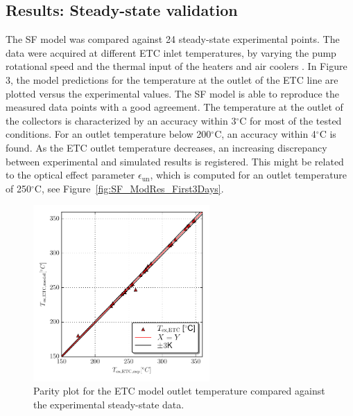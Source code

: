 \documentclass[final,3p,times,review]{elsarticle}
\begin{document}
%
\subsection{Results: Steady-state validation}
%
The SF model was compared against 24 steady-state experimental points. The data were acquired at different ETC inlet temperatures, by varying the pump rotational speed and the thermal input of the heaters and air coolers . In Figure 3, the model predictions for the temperature at the outlet of the ETC line are plotted versus the experimental values.
The SF model is able to reproduce the measured data points with a good agreement. The temperature at the outlet of the collectors is characterized  by an accuracy within 3$^{\circ}$C for most of the tested conditions. For an outlet temperature below 200$^{\circ}$C, an accuracy within 4$^{\circ}$C is found. As the ETC outlet temperature decreases, an increasing discrepancy between experimental and simulated results is registered. This might be related to the optical effect parameter $\epsilon_\mathrm{un}$, which is computed for an outlet temperature of 250$^{\circ}$C, see Figure~\ref{fig:SF_ModRes_First3Days}.
%
\begin{figure}[h!] 
	\centering
	\includegraphics[width=0.6\textwidth]{Figures/StSt_Validation.pdf}
	\caption{Parity plot for the ETC model outlet temperature compared against the experimental steady-state data.}
	\label{fig:SF_ModError}
\end{figure}
%
%
\end{document}
